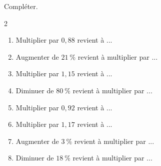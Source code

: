 {\begin{Exercice} %
Compléter.
\vspace{-0.5cm}
\begin{multicols}{2}
\begin{enumerate}
	\item \begin{minipage}[t]{\linewidth}Multiplier par $0{,}88$ revient à ...\end{minipage}
	\item \begin{minipage}[t]{\linewidth}Augmenter de $21~\%$ revient à multiplier par ...\end{minipage}
	\item \begin{minipage}[t]{\linewidth}Multiplier par $1{,}15$ revient à ...\end{minipage}
	\item \begin{minipage}[t]{\linewidth}Diminuer de $80~\%$ revient à multiplier par ...\end{minipage}
	\item \begin{minipage}[t]{\linewidth}Multiplier par $0{,}92$ revient à ...\end{minipage}
	\item \begin{minipage}[t]{\linewidth}Multiplier par $1{,}17$ revient à ...\end{minipage}
	\item \begin{minipage}[t]{\linewidth}Augmenter de $3~\%$ revient à multiplier par ...\end{minipage}
	\item \begin{minipage}[t]{\linewidth}Diminuer de $18~\%$ revient à multiplier par ...\end{minipage}
\end{enumerate}
\end{multicols}
\end{Exercice}


\newpage




}

